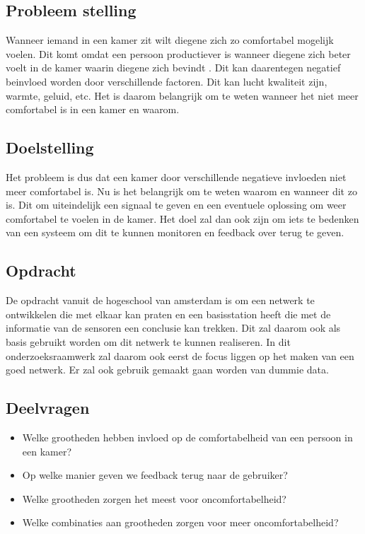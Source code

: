 \subsection{Probleem stelling}
    Wanneer iemand in een kamer zit wilt diegene zich zo comfortabel mogelijk voelen. Dit komt omdat een persoon productiever is wanneer  
    diegene zich beter voelt in de kamer waarin diegene zich bevindt \cite{productiviteit}. Dit kan daarentegen negatief beinvloed worden door verschillende 
    factoren. Dit kan lucht kwaliteit zijn, warmte, geluid, etc. Het is daarom belangrijk om te weten wanneer het niet
    meer comfortabel is in een kamer en waarom.

\subsection{Doelstelling}
    Het probleem is dus dat een kamer door verschillende negatieve invloeden niet meer comfortabel is. Nu is het belangrijk om te weten waarom
    en wanneer dit zo is. Dit om uiteindelijk een signaal te geven en een eventuele oplossing om weer comfortabel te voelen in de kamer.
    Het doel zal dan ook zijn om iets te bedenken van een systeem om dit te kunnen monitoren en feedback over terug te geven.

\subsection{Opdracht}
De opdracht vanuit de hogeschool van amsterdam is om een netwerk te ontwikkelen die met elkaar kan praten en een basisstation heeft die met de 
informatie van de sensoren een conclusie kan trekken. Dit zal daarom ook als basis gebruikt worden om dit netwerk te kunnen realiseren. In dit 
onderzoeksraamwerk zal daarom ook eerst de focus liggen op het maken van een goed netwerk. Er zal ook gebruik gemaakt gaan worden van dummie data.

\subsection{Deelvragen}
\begin{itemize}
    \item Welke grootheden hebben invloed op de comfortabelheid van een persoon in een kamer?
    \item Op welke manier geven we feedback terug naar de gebruiker?
    \item Welke grootheden zorgen het meest voor oncomfortabelheid?
    \item Welke combinaties aan grootheden zorgen voor meer oncomfortabelheid?
\end{itemize}

